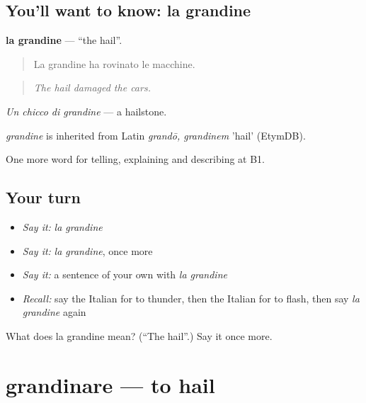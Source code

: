 \subsection*{You'll want to know: la grandine}
\textbf{la grandine} — \textquotedblleft{}the hail\textquotedblright{}.

\begin{quote}
La grandine ha rovinato le macchine.
\end{quote}

\begin{quote}
\emph{The hail damaged the cars.}
\end{quote}

\emph{Un chicco di grandine} — a hailstone.

\begin{cousinweb}
\emph{grandine} is inherited from Latin \emph{grandō, grandinem} 'hail' (EtymDB).
\end{cousinweb}

\begin{grammarlens}[title={What you've built}]
One more word for telling, explaining and describing at B1.
\end{grammarlens}

\subsection*{Your turn}
\begin{itemize}
\raggedright
  \item \emph{Say it:} \emph{la grandine}
  \item \emph{Say it:} \emph{la grandine}, once more
  \item \emph{Say it:} a sentence of your own with \emph{la grandine}
  \item \emph{Recall:} say the Italian for to thunder, then the Italian for to flash, then say \emph{la grandine} again
\end{itemize}

\begin{tcolorbox}[breakable,colback=teal!4,colframe=teal!35!black,title={Before you move on}]
What does la grandine mean? (\textquotedblleft{}The hail\textquotedblright{}.) Say it once more.
\end{tcolorbox}
\section[grandinare]{grandinare — to hail}

\label{lesson:IT-C467-grandinare}



